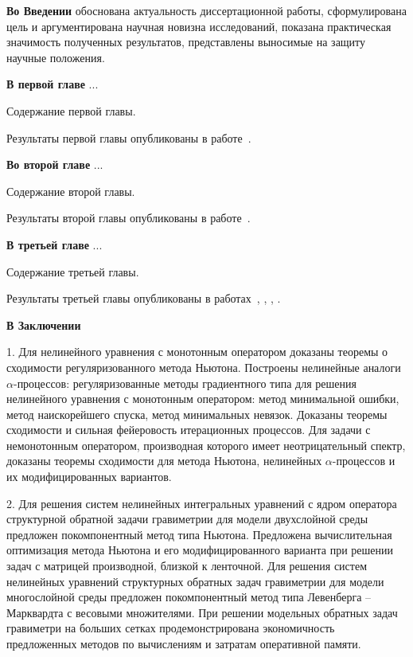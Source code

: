 \documentclass[%
autoref,     %
href,        %
facsimile,   %
colorlinks,  %
]{disser}
\begin{document}
\contribsection
\contribtext

\structsection
\structtext


\textbf{Во Введении} обоснована актуальность диссертационной работы, сформулирована цель и аргументирована научная новизна исследований, показана практическая значимость полученных результатов, представлены выносимые на защиту научные положения.

\textbf{В первой главе} ...

Содержание первой главы.

Результаты первой главы опубликованы в работе~\cite{VasSkur2017}.

\textbf{Во второй главе} ...

Содержание второй главы.

Результаты второй главы опубликованы в работе~\cite{VasSkur2017}.

\textbf{В третьей главе} ...

Содержание третьей главы.

Результаты третьей главы опубликованы в работах~\cite{AkSkur2014}, \cite{AkSkur2015}, \cite{AkSkur2016}, \cite{Skur2017_2}.

\textbf{В Заключении}


1. Для нелинейного уравнения с монотонным оператором доказаны теоремы о сходимости регуляризованного метода Ньютона. 
Построены нелинейные аналоги $\alpha$-процессов:  регуляризованные методы градиентного типа для решения нелинейного уравнения с монотонным оператором: метод минимальной ошибки, метод наискорейшего спуска, метод минимальных невязок. Доказаны теоремы сходимости и сильная фейеровость итерационных процессов. Для задачи с немонотонным оператором, производная которого имеет неотрицательный спектр, доказаны теоремы сходимости для метода  Ньютона, нелинейных $\alpha$-процессов и их модифицированных вариантов.

2. Для решения систем нелинейных интегральных уравнений с 
ядром оператора структурной обратной задачи гравиметрии для 
модели двухслойной среды предложен покомпонентный метод 
типа Ньютона. Предложена вычислительная оптимизация метода 
Ньютона и его модифицированного варианта при решении задач 
с матрицей производной, близкой к ленточной. Для решения систем 
нелинейных уравнений структурных обратных задач гравиметрии 
для модели многослойной среды предложен покомпонентный
метод типа Левенберга – Марквардта с весовыми множителями.
При решении модельных обратных задач гравиметри на больших 
сетках продемонстрирована экономичность предложенных методов
по вычислениям и затратам оперативной памяти.  
\end{document}

